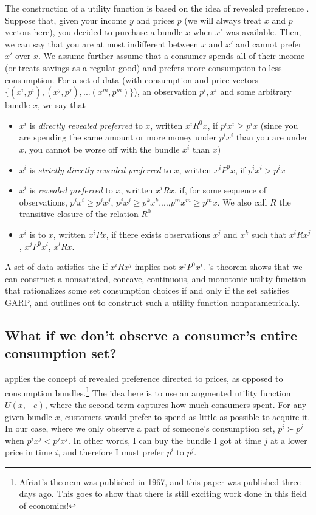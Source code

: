 The construction of a utility function is based on the idea of revealed preference \citep{varianNonparametric}. Suppose that, given your income $y$ and prices $p$ (we will always treat $x$ and $p$ vectors here), you decided to purchase a bundle $x$ when $x'$ was available. Then, we can say that you are at most indifferent between $x$ and $x'$ and cannot prefer $x'$ over $x$. We assume further assume that a consumer spends all of their income (or treats savings as a regular good) and prefers more consumption to less consumption. For a set of data (with consumption and price vectors $\{(x^i,p^i),(x^j, p^j),...(x^m,p^m)\}$), an observation $p^i, x^i$ and some arbitrary bundle $x$, we say that
\begin{itemize}
    \item $x^i$ is \textit{directly revealed preferred} to $x$, written $x^iR^0x$, if $p^ix^i \geq p^ix$ (since you are spending the same amount or more money under $p^ix^i$ than you are under $x$, you cannot be worse off with the bundle $x^i$ than $x$)
    \item $x^i$ is \textit{strictly directly revealed preferred} to $x$, written $x^iP^0x$, if $p^ix^i > p^ix$
    \item $x^i$ is \textit{revealed preferred} to $x$, written $x^iRx$, if, for some sequence of observations, $p^ix^i \geq p^jx^j$, $p^jx^j \geq p^kx^k$,$...$,$p^mx^m \geq p^mx$. We also call $R$ the transitive closure of the relation $R^0$
    \item $x^i$ is  to $x$, written $x^iPx$, if there exists observations $x^j$ and $x^k$ such that $x^i R x^j$, $x^jP^0x^l$, $x^lRx$.
\end{itemize}

A set of data satisfies the  if $x^iRx^j$ implies not $x^jP^0x^i$. \citet{afriat}'s theorem shows that we can construct a nonsatiated, concave, continuous, and monotonic utility function that rationalizes some set consumption choices if and only if the set satisfies GARP, and \citet{varianNonparametric} outlines out to construct such a utility function nonparametrically.

\subsection*{What if we don't observe a consumer's entire consumption set?}
\citet{RPPs} applies the concept of revealed preference directed to prices, as opposed to consumption bundles.\footnote{Afriat's theorem was published in 1967, and this paper was published three days ago. This goes to show that there is still exciting work done in this field of economics!} The idea here is to use an augmented utility function $U(x, -e)$, where the second term captures how much consumers spent. For any given bundle $x$, customers would prefer to spend as little as possible to acquire it. In our case, where we only observe a part of someone's consumption set, $p^i \succ p^j$ when $p^ix^j < p^jx^j$. In other words, I can buy the bundle I got at time $j$ at a lower price in time $i$, and therefore I must prefer $p^i$ to $p^j$.


